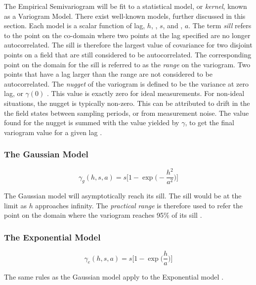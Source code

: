 The Empirical Semivariogram will be fit to a statistical model, or \textit{kernel}, known as a Variogram Model. There exist well-known models, further discussed in this section. Each model is a scalar function of lag, $h$, , $s$, and , $a$. The term \textit{sill} refers to the point on the co-domain where two points at the lag specified are no longer autocorrelated. The sill is therefore the largest value of covariance for two disjoint points on a field that are still considered to be autocorrelated. The corresponding point on the domain for the sill is referred to as the \textit{range} on the variogram. Two points that have a lag larger than the range are not considered to be autocorrelated. The \textit{nugget} of the variogram is defined to be the variance at zero lag, or $\gamma(0)$ \cite{matheron:geostat}. This value is exactly zero for ideal measurements. For non-ideal situations, the nugget is typically non-zero. This can be attributed to drift in the the field states between sampling periods, or from measurement noise. The value found for the nugget is summed with the value yielded by $\gamma$, to get the final variogram value for a given lag \cite{goov:97}.

\subsubsection{The Gaussian Model}

\begin{equation}
	\gamma_g(h, s, a) = s \Bigg[ 1 - \exp \Bigg( -\dfrac{h^2}{a^2} \Bigg) \Bigg]
	\label{eq:gauss_model}
\end{equation}

The Gaussian model will asymptotically reach its sill. The sill would be at the limit as $h$ approaches infinity. The \textit{practical range} is therefore used to refer the point on the domain where the variogram reaches 95\% of its sill \cite{goov:97}.

\subsubsection{The Exponential Model}

\begin{equation}
	\gamma_e(h, s, a) = s \Bigg[ 1 - \exp \Bigg( \dfrac{h}{a} \Bigg) \Bigg]
	\label{eq:exp_model}
\end{equation}

The same rules as the Gaussian model apply to the Exponential model \cite{goov:97}.

